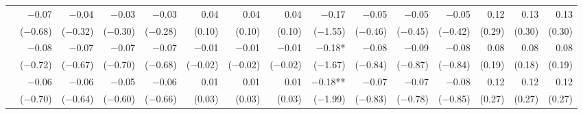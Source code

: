\begin{tabularx}{1.45\textwidth}{lRRRRRRRRRRRRRR}
		 & \num{-0.07}\phantom{***)} & \num{-0.04}\phantom{***)} & \num{-0.03}\phantom{***)} & \num{-0.03}\phantom{***)} & \num{0.04}\phantom{***)} & \num{0.04}\phantom{***)} & \num{0.04}\phantom{***)} & \num{-0.17}\phantom{***)} & \num{-0.05}\phantom{***)} & \num{-0.05}\phantom{***)} & \num{-0.05}\phantom{***)} & \num{0.12}\phantom{***)} & \num{0.13}\phantom{***)} & \num{0.13}\phantom{***)} \\
		 & (\num{-0.68})\phantom{***} & (\num{-0.32})\phantom{***} & (\num{-0.30})\phantom{***} & (\num{-0.28})\phantom{***} & (\num{0.10})\phantom{***} & (\num{0.10})\phantom{***} & (\num{0.10})\phantom{***} & (\num{-1.55})\phantom{***} & (\num{-0.46})\phantom{***} & (\num{-0.45})\phantom{***} & (\num{-0.42})\phantom{***} & (\num{0.29})\phantom{***} & (\num{0.30})\phantom{***} & (\num{0.30})\phantom{***} \\ [\dspacing]
		 & \num{-0.08}\phantom{***)} & \num{-0.07}\phantom{***)} & \num{-0.07}\phantom{***)} & \num{-0.07}\phantom{***)} & \num{-0.01}\phantom{***)} & \num{-0.01}\phantom{***)} & \num{-0.01}\phantom{***)} & \num{-0.18}*\phantom{**)} & \num{-0.08}\phantom{***)} & \num{-0.09}\phantom{***)} & \num{-0.08}\phantom{***)} & \num{0.08}\phantom{***)} & \num{0.08}\phantom{***)} & \num{0.08}\phantom{***)} \\
		 & (\num{-0.72})\phantom{***} & (\num{-0.67})\phantom{***} & (\num{-0.70})\phantom{***} & (\num{-0.68})\phantom{***} & (\num{-0.02})\phantom{***} & (\num{-0.02})\phantom{***} & (\num{-0.02})\phantom{***} & (\num{-1.67})\phantom{***} & (\num{-0.84})\phantom{***} & (\num{-0.87})\phantom{***} & (\num{-0.84})\phantom{***} & (\num{0.19})\phantom{***} & (\num{0.18})\phantom{***} & (\num{0.19})\phantom{***} \\ [\dspacing]
		 & \num{-0.06}\phantom{***)} & \num{-0.06}\phantom{***)} & \num{-0.05}\phantom{***)} & \num{-0.06}\phantom{***)} & \num{0.01}\phantom{***)} & \num{0.01}\phantom{***)} & \num{0.01}\phantom{***)} & \num{-0.18}**\phantom{*)} & \num{-0.07}\phantom{***)} & \num{-0.07}\phantom{***)} & \num{-0.08}\phantom{***)} & \num{0.12}\phantom{***)} & \num{0.12}\phantom{***)} & \num{0.12}\phantom{***)} \\
		 & (\num{-0.70})\phantom{***} & (\num{-0.64})\phantom{***} & (\num{-0.60})\phantom{***} & (\num{-0.66})\phantom{***} & (\num{0.03})\phantom{***} & (\num{0.03})\phantom{***} & (\num{0.03})\phantom{***} & (\num{-1.99})\phantom{***} & (\num{-0.83})\phantom{***} & (\num{-0.78})\phantom{***} & (\num{-0.85})\phantom{***} & (\num{0.27})\phantom{***} & (\num{0.27})\phantom{***} & (\num{0.27})\phantom{***} \\ [\dspacing]

\end{tabularx}
